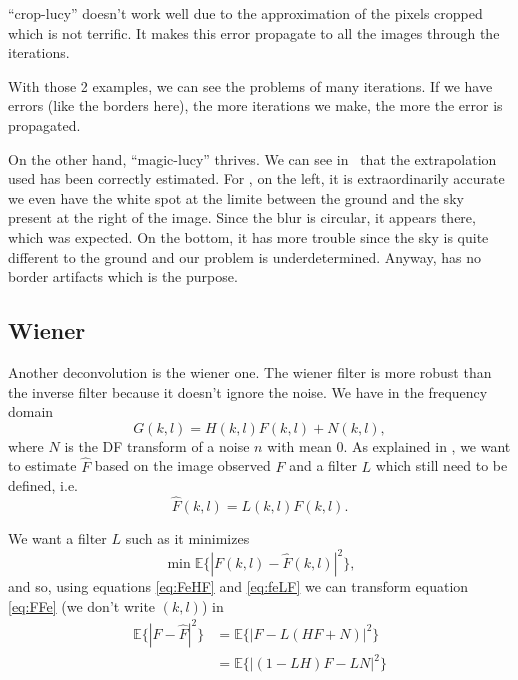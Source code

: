 ``crop-lucy'' doesn't work well due to the approximation of the pixels
cropped which is not terrific.
It makes this error propagate to all the images through the iterations.

With those 2 examples, we can see the problems of many iterations.
If we have errors (like the borders here), the more iterations
we make, the more the error is propagated.

On the other hand, ``magic-lucy'' thrives.
We can see in~
that the extrapolation used has been correctly estimated.
For ,
on the left, it is extraordinarily accurate we even have the white
spot at the limite between the ground and the sky present at the right of the image.
Since the blur is circular, it appears there, which was expected.
On the bottom, it has more trouble since the sky is quite different to the
ground and our problem is underdetermined.
Anyway,  has no border artifacts which
is the purpose.

\subsection{Wiener}
\label{subsec:Wiener}
 Another deconvolution is the wiener one. The wiener filter is more robust than the inverse filter because it doesn't ignore the noise. We have in the frequency domain
\begin{equation}
G(k,l) = H(k,l)F(k,l) + N(k,l),
\label{eq:FeHF}
\end{equation} 
 where $N$ is the DF transform of a noise $n$ with mean $0$. As explained in \cite{gonzalez2002digital}, we want to estimate $\hat{F}$ based on the image observed $F$ and a filter $L$ which still need to be defined, i.e. 
 \begin{equation}
\hat{F}(k,l) = L(k,l)F(k,l).
 \label{eq:feLF}
 \end{equation}

We want a filter $L$ such as it minimizes 
\begin{equation}
\min \mathbb{E}\{|F(k,l) - \hat{F}(k,l)|^2\},
\label{eq:FFe}
\end{equation}
and so, using equations \eqref{eq:FeHF} and \eqref{eq:feLF} we can transform equation \eqref{eq:FFe} (we don't write $(k,l)$) in 
\begin{align*}
\mathbb{E}\{|F - \hat{F}|^2\} &= \mathbb{E}\{|F - L(HF+N)|^2\}\\
	&= \mathbb{E}\{|(1-LH)F - LN|^2\}
\end{align*}

